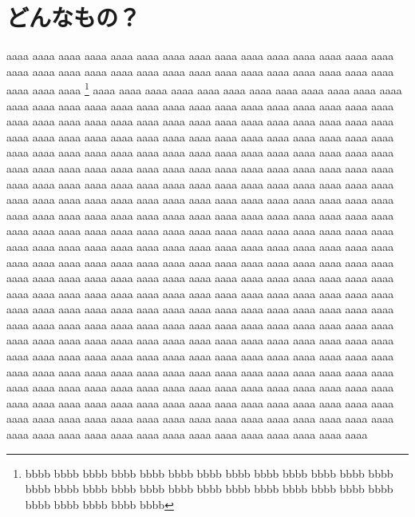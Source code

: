 \documentclass[10pt,dvipdfmx,landscape]{jsarticle}
\begin{document}
\section{どんなもの？}
%
aaaa aaaa aaaa aaaa aaaa aaaa aaaa aaaa aaaa aaaa aaaa 
aaaa aaaa aaaa aaaa aaaa aaaa aaaa aaaa aaaa aaaa aaaa 
aaaa aaaa aaaa aaaa aaaa aaaa aaaa aaaa aaaa aaaa aaaa 
\footnote{bbbb bbbb bbbb bbbb bbbb bbbb bbbb bbbb bbbb
bbbb bbbb bbbb bbbb bbbb bbbb bbbb bbbb bbbb bbbb bbbb 
bbbb bbbb bbbb bbbb bbbb bbbb bbbb bbbb bbbb bbbb bbbb} 
aaaa aaaa aaaa aaaa aaaa aaaa aaaa aaaa aaaa aaaa aaaa 
aaaa aaaa aaaa aaaa aaaa aaaa aaaa aaaa aaaa aaaa aaaa 
aaaa aaaa aaaa aaaa aaaa aaaa aaaa aaaa aaaa aaaa aaaa 
aaaa aaaa aaaa aaaa aaaa aaaa aaaa aaaa aaaa aaaa aaaa 
aaaa aaaa aaaa aaaa aaaa aaaa aaaa aaaa aaaa aaaa aaaa 
aaaa aaaa aaaa aaaa aaaa aaaa aaaa aaaa aaaa aaaa aaaa 
aaaa aaaa aaaa aaaa aaaa aaaa aaaa aaaa aaaa aaaa aaaa 
aaaa aaaa aaaa aaaa aaaa aaaa aaaa aaaa aaaa aaaa aaaa 
aaaa aaaa aaaa aaaa aaaa aaaa aaaa aaaa aaaa aaaa aaaa 
aaaa aaaa aaaa aaaa aaaa aaaa aaaa aaaa aaaa aaaa aaaa 
aaaa aaaa aaaa aaaa aaaa aaaa aaaa aaaa aaaa aaaa aaaa 
aaaa aaaa aaaa aaaa aaaa aaaa aaaa aaaa aaaa aaaa aaaa 
aaaa aaaa aaaa aaaa aaaa aaaa aaaa aaaa aaaa aaaa aaaa 
aaaa aaaa aaaa aaaa aaaa aaaa aaaa aaaa aaaa aaaa aaaa 
aaaa aaaa aaaa aaaa aaaa aaaa aaaa aaaa aaaa aaaa aaaa 
aaaa aaaa aaaa aaaa aaaa aaaa aaaa aaaa aaaa aaaa aaaa 
aaaa aaaa aaaa aaaa aaaa aaaa aaaa aaaa aaaa aaaa aaaa 
aaaa aaaa aaaa aaaa aaaa aaaa aaaa aaaa aaaa aaaa aaaa 
aaaa aaaa aaaa aaaa aaaa aaaa aaaa aaaa aaaa aaaa aaaa 
aaaa aaaa aaaa aaaa aaaa aaaa aaaa aaaa aaaa aaaa aaaa 
aaaa aaaa aaaa aaaa aaaa aaaa aaaa aaaa aaaa aaaa aaaa 
aaaa aaaa aaaa aaaa aaaa aaaa aaaa aaaa aaaa aaaa aaaa 
aaaa aaaa aaaa aaaa aaaa aaaa aaaa aaaa aaaa aaaa aaaa 
aaaa aaaa aaaa aaaa aaaa aaaa aaaa aaaa aaaa aaaa aaaa 
aaaa aaaa aaaa aaaa aaaa aaaa aaaa aaaa aaaa aaaa aaaa 
aaaa aaaa aaaa aaaa aaaa aaaa aaaa aaaa aaaa aaaa aaaa 
aaaa aaaa aaaa aaaa aaaa aaaa aaaa aaaa aaaa aaaa aaaa 
aaaa aaaa aaaa aaaa aaaa aaaa aaaa aaaa aaaa aaaa aaaa 
aaaa aaaa aaaa aaaa aaaa aaaa aaaa aaaa aaaa aaaa aaaa 
aaaa aaaa aaaa aaaa aaaa aaaa aaaa aaaa aaaa aaaa aaaa 
aaaa aaaa aaaa aaaa aaaa aaaa aaaa aaaa aaaa aaaa aaaa 
\end{document}
